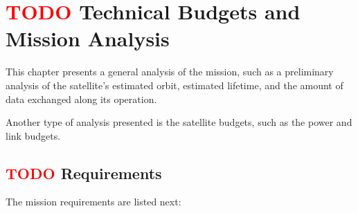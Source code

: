 %
%
%
%
%

%
%
%
%
%
%

\chapter{ \textcolor{red}{TODO} Technical Budgets and Mission Analysis} \label{ch:budgets}

This chapter presents a general analysis of the mission, such as a preliminary analysis of the satellite's estimated orbit, estimated lifetime, and the amount of data exchanged along its operation.

Another type of analysis presented is the satellite budgets, such as the power and link budgets.

\section{ \textcolor{red}{TODO} Requirements}

The mission requirements are listed next:

